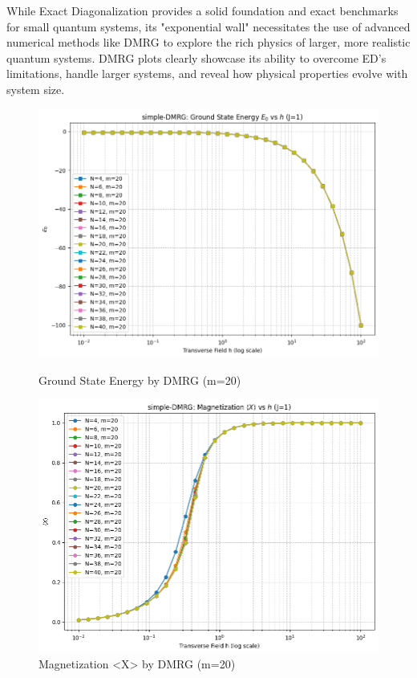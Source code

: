 \documentclass[pre,twocolumn,floatfix]{revtex4-1}
\begin{document}
While Exact Diagonalization provides a solid foundation and exact benchmarks for small quantum systems, its "exponential wall" necessitates the use of advanced numerical methods like DMRG to explore the rich physics of larger, more realistic quantum systems. DMRG plots clearly showcase its ability to overcome ED's limitations, handle larger systems, and reveal how physical properties evolve with system size.
\begin{figure}[htbp]
    \centering
    \begin{minipage}{0.48\textwidth}
        \centering
        \includegraphics[width=\linewidth]{images/E_DMRG.png} %
        \caption{Ground State Energy by DMRG (m=20)}
        \label{dmrg_a}
    \end{minipage}\hfill %
    \begin{minipage}{0.48\textwidth}
        \centering
        \includegraphics[width=\linewidth]{images/mx_DMRG.png} %
        \caption{Magnetization <X> by DMRG (m=20)}
        \label{dmrg_b}
    \end{minipage}
\end{figure}
\end{document}

